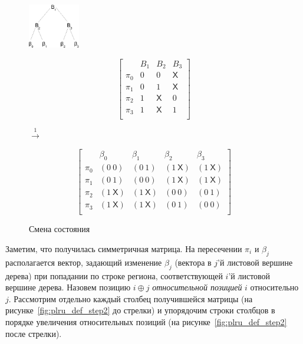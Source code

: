 \begin{enumerate}
\begin{figure}[h]
\parbox{0.2\textwidth}{ \centering
  \includegraphics[width=0.2\textwidth]{1.review/btree}
}
\parbox{0.25\textwidth}{
$$ \left[
  \begin{array}{c|ccc}
          & B_1 & B_2 & B_3 \\ \hline
    \pi_0 & 0 & 0 & \textsf{X} \\
    \pi_1 & 0 & 1 & \textsf{X} \\
    \pi_2 & 1 & \textsf{X} & 0 \\
    \pi_3 & 1 & \textsf{X} & 1 \\
  \end{array}
\right]
$$
} $\stackrel{1}{\longrightarrow}$ %
\parbox{0.4\textwidth}{
$$ \left[
  \begin{array}{c|cccc}
          & \beta_0 & \beta_1 & \beta_2 & \beta_3 \\ \hline
    \pi_0 & (0~0) & (0~1) & (1~\textsf{X}) & (1~\textsf{X}) \\
    \pi_1 & (0~1) & (0~0) & (1~\textsf{X}) & (1~\textsf{X}) \\
    \pi_2 & (1~\textsf{X}) & (1~\textsf{X}) & (0~0) & (0~1) \\
    \pi_3 & (1~\textsf{X}) & (1~\textsf{X}) & (0~1) & (0~0) \\
  \end{array}
\right]
$$
}
\caption{Смена состояния}\label{fig:plru_def_step1}
\end{figure}

Заметим, что получилась симметричная матрица. На пересечении $\pi_i$
и $\beta_j$ располагается вектор, задающий изменение $\beta_j$ (вектора в $j$'й
листовой вершине дерева) при попадании по строке региона, соответствующей $i$'й листовой вершине дерева. Назовем позицию $i \oplus j$ \emph{относительной позицией}
$i$ относительно $j$. Рассмотрим отдельно каждый столбец
получившейся матрицы (на рисунке~\ref{fig:plru_def_step2} до стрелки) и упорядочим строки столбцов в порядке увеличения относительных позиций (на рисунке~\ref{fig:plru_def_step2} после стрелки).


\end{enumerate}
